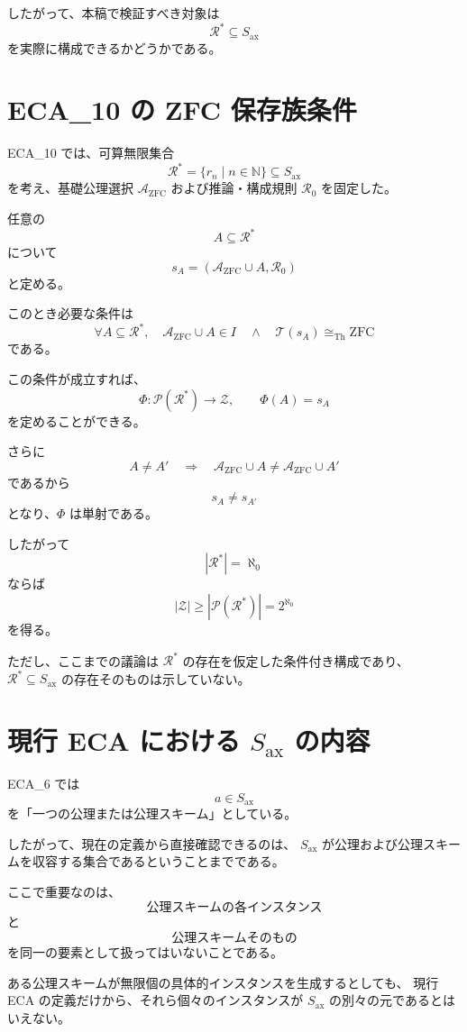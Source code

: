\documentclass[a4paper,11pt]{article}
\newcommand{\Ax}{S_{\mathrm{ax}}}
\newcommand{\Sel}{I}
\begin{document}
したがって、本稿で検証すべき対象は
\[
\mathcal{R}^{*}\subseteq\Ax
\]
を実際に構成できるかどうかである。

\section{ECA_10 の ZFC 保存族条件}

ECA_10 では、可算無限集合
\[
\mathcal{R}^{*}=\{r_n\mid n\in\mathbb{N}\}\subseteq\Ax
\]
を考え、基礎公理選択 $\mathcal{A}_{\mathrm{ZFC}}$ および推論・構成規則
$\mathcal{R}_0$ を固定した。

任意の
\[
A\subseteq\mathcal{R}^{*}
\]
について
\[
s_A=
\left(
\mathcal{A}_{\mathrm{ZFC}}\cup A,\mathcal{R}_0
\right)
\]
と定める。

このとき必要な条件は
\[
\boxed{
\forall A\subseteq\mathcal{R}^{*},
\quad
\mathcal{A}_{\mathrm{ZFC}}\cup A\in\Sel
\quad\land\quad
\mathcal{T}(s_A)\cong_{\mathrm{Th}}\mathrm{ZFC}
}
\]
である。

この条件が成立すれば、
\[
\Phi:\mathcal{P}(\mathcal{R}^{*})\longrightarrow\mathcal{Z},
\qquad
\Phi(A)=s_A
\]
を定めることができる。

さらに
\[
A\neq A'
\quad\Longrightarrow\quad
\mathcal{A}_{\mathrm{ZFC}}\cup A
\neq
\mathcal{A}_{\mathrm{ZFC}}\cup A'
\]
であるから
\[
s_A\neq s_{A'}
\]
となり、$\Phi$ は単射である。

したがって
\[
|\mathcal{R}^{*}|=\aleph_0
\]
ならば
\[
|\mathcal{Z}|
\ge
|\mathcal{P}(\mathcal{R}^{*})|
=
2^{\aleph_0}
\]
を得る。

ただし、ここまでの議論は $\mathcal{R}^{*}$ の存在を仮定した条件付き構成であり、
$\mathcal{R}^{*}\subseteq\Ax$ の存在そのものは示していない。

\section{現行 ECA における $\Ax$ の内容}

ECA_6 では
\[
a\in\Ax
\]
を「一つの公理または公理スキーム」としている。

したがって、現在の定義から直接確認できるのは、
$\Ax$ が公理および公理スキームを収容する集合であるということまでである。

ここで重要なのは、
\[
\text{公理スキームの各インスタンス}
\]
と
\[
\text{公理スキームそのもの}
\]
を同一の要素として扱ってはいないことである。

ある公理スキームが無限個の具体的インスタンスを生成するとしても、
現行 ECA の定義だけから、それら個々のインスタンスが
$\Ax$ の別々の元であるとはいえない。
\end{document}
